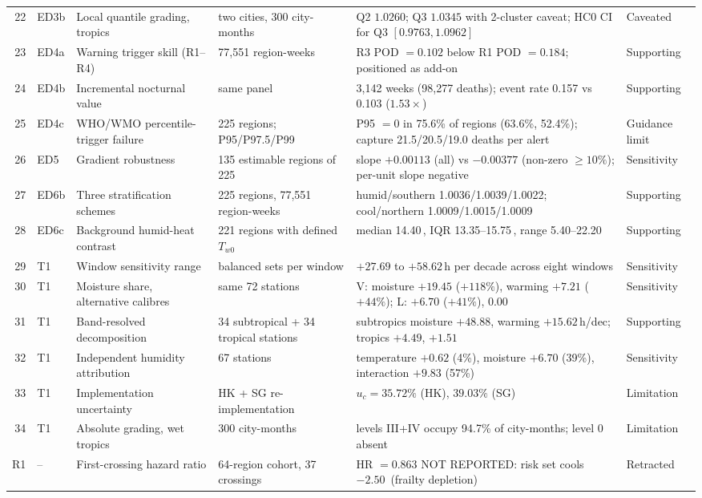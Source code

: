 \begin{table}[p]
\begin{tabular}{rllp{2.6cm}p{4.6cm}l}
22 & ED3b & Local quantile grading, tropics & two cities, 300 city-months & Q2 $1.0260$; Q3 $1.0345$ with 2-cluster caveat; HC0 CI for Q3 $[0.9763,1.0962]$ & Caveated \\
23 & ED4a & Warning trigger skill (R1--R4) & 77,551 region-weeks & R3 POD $=0.102$ below R1 POD $=0.184$; positioned as add-on & Supporting \\
24 & ED4b & Incremental nocturnal value & same panel & 3,142 weeks (98,277 deaths); event rate 0.157 vs 0.103 ($1.53\times$) & Supporting \\
25 & ED4c & WHO/WMO percentile-trigger failure & 225 regions; P95/P97.5/P99 & P95 $=0$ in 75.6\% of regions (63.6\%, 52.4\%); capture 21.5/20.5/19.0 deaths per alert & Guidance limit \\
26 & ED5 & Gradient robustness & 135 estimable regions of 225 & slope $+0.00113$ (all) vs $-0.00377$ (non-zero $\geq10\%$); per-unit slope negative & Sensitivity \\
27 & ED6b & Three stratification schemes & 225 regions, 77,551 region-weeks & humid/southern 1.0036/1.0039/1.0022; cool/northern 1.0009/1.0015/1.0009 & Supporting \\
28 & ED6c & Background humid-heat contrast & 221 regions with defined $T_{w0}$ & median 14.40\,\dd{}, IQR 13.35--15.75\,\dd{}, range 5.40--22.20\,\dd{} & Supporting \\
29 & T1 & Window sensitivity range & balanced sets per window & $+27.69$ to $+58.62$\,h per decade across eight windows & Sensitivity \\
30 & T1 & Moisture share, alternative calibres & same 72 stations & V: moisture $+19.45$ ($+118\%$), warming $+7.21$ ($+44\%$); L: $+6.70$ ($+41\%$), 0.00 & Sensitivity \\
31 & T1 & Band-resolved decomposition & 34 subtropical + 34 tropical stations & subtropics moisture $+48.88$, warming $+15.62$\,h/dec; tropics $+4.49$, $+1.51$ & Supporting \\
32 & T1 & Independent humidity attribution & 67 stations & temperature $+0.62$ (4\%), moisture $+6.70$ (39\%), interaction $+9.83$ (57\%) & Sensitivity \\
33 & T1 & Implementation uncertainty & HK + SG re-implementation & $u_c=35.72\%$ (HK), $39.03\%$ (SG) & Limitation \\
34 & T1 & Absolute grading, wet tropics & 300 city-months & levels III+IV occupy 94.7\% of city-months; level 0 absent & Limitation \\
\midrule
R1 & -- & First-crossing hazard ratio & 64-region cohort, 37 crossings & HR $=0.863$ NOT REPORTED: risk set cools $-2.50$\,\dd{} (frailty depletion) & Retracted \\

\end{tabular}
\end{table}

